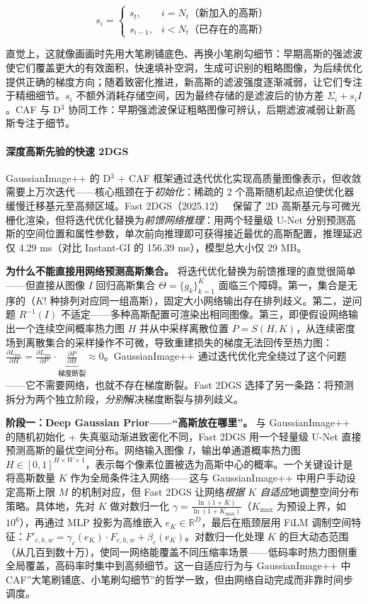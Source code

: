 \begin{equation}
s_i = \begin{cases} s_t, & i = N_t \text{（新加入的高斯）} \\ s_{i-1}, & i < N_t \text{（已存在的高斯）} \end{cases}
\end{equation}

直觉上，这就像画画时先用大笔刷铺底色、再换小笔刷勾细节：早期高斯的强滤波使它们覆盖更大的有效面积，快速填补空洞，生成可识别的粗略图像，为后续优化提供正确的梯度方向；随着致密化推进，新高斯的滤波强度逐渐减弱，让它们专注于精细细节。$s_i$ 不额外消耗存储空间，因为最终存储的是滤波后的协方差 $\Sigma_i + s_i I$。CAF 与 D$^3$ 协同工作：早期强滤波保证粗略图像可辨认，后期滤波减弱让新高斯专注于细节。

\paragraph{深度高斯先验的快速 2DGS}

GaussianImage++ 的 D$^3$ + CAF 框架通过迭代优化实现高质量图像表示，但收敛需要上万次迭代——核心瓶颈在于\textit{初始化}：稀疏的 2 个高斯随机起点迫使优化器缓慢迁移基元至高频区域。Fast 2DGS（2025.12）~\cite{2512_12774} 保留了 2D 高斯基元与可微光栅化渲染，但将迭代优化替换为\textit{前馈网络推理}：用两个轻量级 U-Net 分别预测高斯的空间位置和属性参数，单次前向推理即可获得接近最优的高斯配置，推理延迟仅 4.29 ms（对比 Instant-GI 的 156.39 ms），模型总大小仅 29 MB。

\textbf{为什么不能直接用网络预测高斯集合。} 将迭代优化替换为前馈推理的直觉很简单——但直接从图像 $I$ 回归高斯集合 $\Theta = \{g_k\}_{k=1}^K$ 面临三个障碍。第一，集合是无序的（$K!$ 种排列对应同一组高斯），固定大小网络输出存在排列歧义。第二，逆问题 $R^{-1}(I)$ 不适定——多种高斯配置可渲染出相同图像。第三，即便假设网络输出一个连续空间概率热力图 $H$ 并从中采样离散位置 $P = S(H, K)$，从连续密度场到离散集合的采样操作不可微，导致重建损失的梯度无法回传至热力图：$\frac{\partial L_\text{rec}}{\partial H} = \frac{\partial L_\text{rec}}{\partial P} \cdot \underbrace{\frac{\partial P}{\partial H}}_{\text{梯度断裂}} \approx 0$。GaussianImage++ 通过迭代优化完全绕过了这个问题——它不需要网络，也就不存在梯度断裂。Fast 2DGS 选择了另一条路：将预测拆分为两个独立阶段，\textit{分别}解决梯度断裂与排列歧义。

\textbf{阶段一：Deep Gaussian Prior——“高斯放在哪里”。} 与 GaussianImage++ 的随机初始化 + 失真驱动渐进致密化不同，Fast 2DGS 用一个轻量级 U-Net 直接预测高斯的最优空间分布。网络输入图像 $I$，输出单通道概率热力图 $H \in [0, 1]^{H \times W \times 1}$，表示每个像素位置被选为高斯中心的概率。一个关键设计是将高斯数量 $K$ 作为全局条件注入网络——这与 GaussianImage++ 中用户手动设定高斯上限 $M$ 的机制对应，但 Fast 2DGS 让网络\textit{根据 $K$ 自适应}地调整空间分布策略。具体地，先对 $K$ 做对数归一化 $\gamma = \frac{\ln(1+K)}{\ln(1+K_{\max})}$（$K_{\max}$ 为预设上界，如 $10^6$），再通过 MLP 投影为高维嵌入 $e_K \in \mathbb{R}^D$，最后在瓶颈层用 FiLM 调制空间特征：$F'_{c,h,w} = \gamma_c(e_K) \cdot F_{c,h,w} + \beta_c(e_K)$。对数归一化处理 $K$ 的巨大动态范围（从几百到数十万），使同一网络能覆盖不同压缩率场景——低码率时热力图侧重全局覆盖，高码率时集中到高频细节。这一自适应行为与 GaussianImage++ 中 CAF”大笔刷铺底、小笔刷勾细节”的哲学一致，但由网络自动完成而非靠时间步调度。

